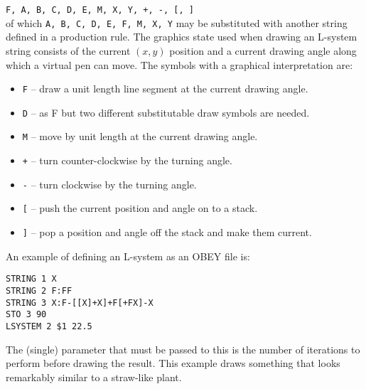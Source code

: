 \documentclass[a4paper,twoside,11pt]{article}
\newcommand{\newpara}{\par\vspace{4mm}\noindent}
\begin{document}
\texttt{F, A, B, C, D, E, M, X, Y, +, -, [, ]}\\
of which \texttt{A, B, C, D, E, F, M, X, Y} may be substituted with another string defined in a production rule.
The graphics state used when drawing an L-system string consists of the current $(x,y)$ position and a current
drawing angle along which a virtual pen can move. The symbols with a graphical interpretation are:
\begin{itemize}
\item \texttt{F} -- draw a unit length line segment at the current drawing angle.
\item \texttt{D} -- as F but two different substitutable draw symbols are needed.
\item \texttt{M} -- move by unit length at the current drawing angle.
\item \texttt{+} -- turn counter-clockwise by the turning angle.
\item \texttt{-} -- turn clockwise by the turning angle.
\item \texttt{[} -- push the current position and angle on to a stack.
\item \texttt{]} -- pop a position and angle off the stack and make them current.
\end{itemize}
\newpara
An example of defining an L-system as an OBEY file is:
\begin{verbatim}
STRING 1 X
STRING 2 F:FF
STRING 3 X:F-[[X]+X]+F[+FX]-X 
STO 3 90
LSYSTEM 2 $1 22.5
\end{verbatim}
The (single) parameter that must be passed to this is the number of iterations to perform
before drawing the result. This example draws something that looks remarkably similar to
a straw-like plant.
\end{document}
